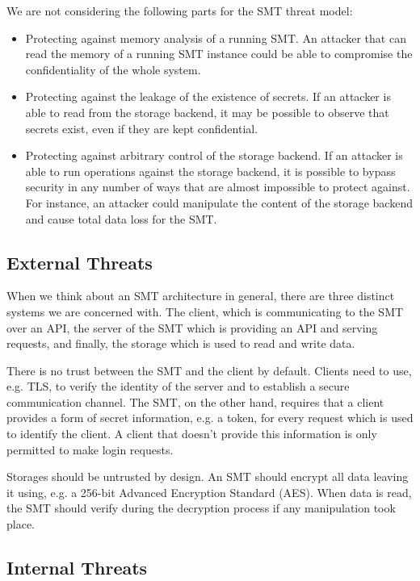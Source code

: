 \documentclass[runningheads]{llncs}
\begin{document}
We are not considering the following parts for the SMT threat model:

\begin{itemize}
\setlength\itemsep{1mm}
\item Protecting against memory analysis of a running SMT. An attacker that can read the memory of a running SMT instance could be able to compromise the confidentiality of the whole system.

\item Protecting against the leakage of the existence of secrets. If an attacker is able to read from the storage backend, it may be possible to observe that secrets exist, even if they are kept confidential.

\item Protecting against arbitrary control of the storage backend. If an attacker is able to run operations against the storage backend, it is possible to bypass security in any number of ways that are almost impossible to protect against. For instance, an attacker could manipulate the content of the storage backend and cause total data loss for the SMT.
\end{itemize}

\subsection{External Threats}

When we think about an SMT architecture in general, there are three distinct systems we are concerned with. The client, which is communicating to the SMT over an API, the server of the SMT which is providing an API and serving requests, and finally, the storage which is used to read and write data. 

There is no trust between the SMT and the client by default. Clients need to use, e.g. TLS, to verify the identity of the server and to establish a secure communication channel. The SMT, on the other hand, requires that a client provides a form of secret information, e.g. a token, for every request which is used to identify the client. A client that doesn't provide this information is only permitted to make login requests.

Storages should be untrusted by design. An SMT should encrypt all data leaving it using, e.g. a 256-bit Advanced Encryption Standard (AES). When data is read, the SMT should verify during the decryption process if any manipulation took place.

\subsection{Internal Threats}
\label{sec:internal_threats}
\end{document}
